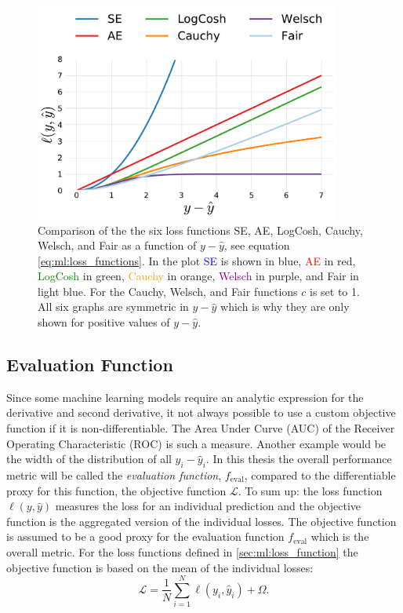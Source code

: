 \begin{figure}
  \includegraphics[width=0.9\textwidth]{figures/objective_functions/objective_functions.pdf}
  \caption[Objective Functions]
    {Comparison of the the six loss functions SE, AE, LogCosh, Cauchy, Welsch, and Fair as a function of $y-\hat{y}$, see equation \eqref{eq:ml:loss_functions}. In the plot \textcolor{blue}{SE} is shown in blue, \textcolor{red}{AE} in red, \textcolor{green}{LogCosh} in green, \textcolor{orange}{Cauchy} in orange, \textcolor{purple}{Welsch} in purple, and \textcolor{light-blue}{Fair} in light blue. For the Cauchy, Welsch, and Fair functions $c$ is set to 1. 
    All six graphs are symmetric in $y-\hat{y}$ which is why they are only shown for positive values of $y-\hat{y}$.
    }
  \label{fig:ml:objective_funcs}
\end{figure}


\subsection{Evaluation Function}
Since some machine learning models require an analytic expression for the derivative and second derivative, it not always possible to use a custom objective function if it is non-differentiable. The Area Under Curve (AUC) of the Receiver Operating Characteristic (ROC) is such a measure. Another example would be the width of the distribution of all $y_i-\hat{y}_i$. In this thesis the overall performance metric will be called the \emph{evaluation function}, $f_\mathrm{eval}$, compared to the differentiable proxy for this function, the objective function $\mathcal{L}$. To sum up: the loss function $\ell(y, \hat{y})$ measures the loss for an individual prediction and the objective function is the aggregated version of the individual losses. The objective function is assumed to be a good proxy for the evaluation function $f_\mathrm{eval}$ which is the overall metric.  
For the loss functions defined in \autoref{sec:ml:loss_function} the objective function is based on the mean of the individual losses:
\begin{equation}
  \mathcal{L} = \frac{1}{N} \sum_{i=1}^N \ell(y_i, \hat{y}_i) + \Omega. 
\end{equation}

